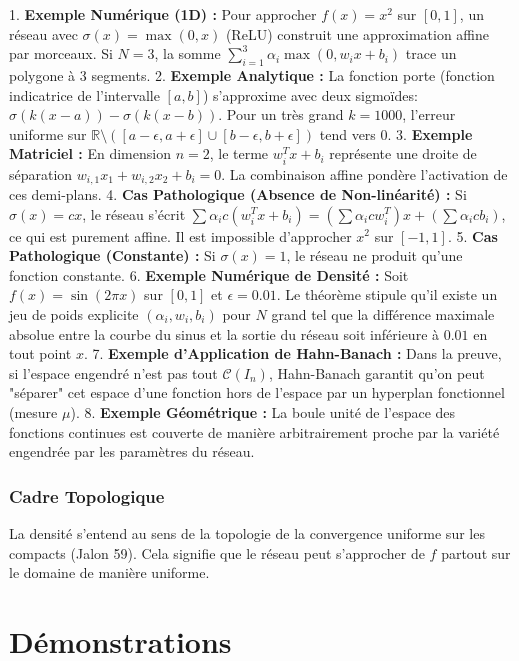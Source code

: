 \documentclass[11pt,a4paper]{article}
\begin{document}
1. \textbf{Exemple Numérique (1D) :} Pour approcher $f(x) = x^2$ sur $[0,1]$, un réseau avec $\sigma(x) = \max(0,x)$ (ReLU) construit une approximation affine par morceaux. Si $N=3$, la somme $\sum_{i=1}^3 \alpha_i \max(0, w_i x + b_i)$ trace un polygone à 3 segments.
2. \textbf{Exemple Analytique :} La fonction porte (fonction indicatrice de l'intervalle $[a,b]$) s'approxime avec deux sigmoïdes: $\sigma(k(x-a)) - \sigma(k(x-b))$. Pour un très grand $k=1000$, l'erreur uniforme sur $\mathbb{R} \setminus ([a-\epsilon, a+\epsilon] \cup [b-\epsilon, b+\epsilon])$ tend vers $0$.
3. \textbf{Exemple Matriciel :} En dimension $n=2$, le terme $w_i^T x + b_i$ représente une droite de séparation $w_{i,1} x_1 + w_{i,2} x_2 + b_i = 0$. La combinaison affine pondère l'activation de ces demi-plans.
4. \textbf{Cas Pathologique (Absence de Non-linéarité) :} Si $\sigma(x) = cx$, le réseau s'écrit $\sum \alpha_i c(w_i^T x + b_i) = (\sum \alpha_i c w_i^T) x + (\sum \alpha_i c b_i)$, ce qui est purement affine. Il est impossible d'approcher $x^2$ sur $[-1, 1]$.
5. \textbf{Cas Pathologique (Constante) :} Si $\sigma(x) = 1$, le réseau ne produit qu'une fonction constante.
6. \textbf{Exemple Numérique de Densité :} Soit $f(x) = \sin(2\pi x)$ sur $[0,1]$ et $\epsilon = 0.01$. Le théorème stipule qu'il existe un jeu de poids explicite $(\alpha_i, w_i, b_i)$ pour $N$ grand tel que la différence maximale absolue entre la courbe du sinus et la sortie du réseau soit inférieure à $0.01$ en tout point $x$.
7. \textbf{Exemple d'Application de Hahn-Banach :} Dans la preuve, si l'espace engendré n'est pas tout $\mathcal{C}(I_n)$, Hahn-Banach garantit qu'on peut "séparer" cet espace d'une fonction hors de l'espace par un hyperplan fonctionnel (mesure $\mu$).
8. \textbf{Exemple Géométrique :} La boule unité de l'espace des fonctions continues est couverte de manière arbitrairement proche par la variété engendrée par les paramètres du réseau.


\subsubsection{Cadre Topologique}

La densité s'entend au sens de la topologie de la convergence uniforme sur les compacts (Jalon 59). Cela signifie que le réseau peut s'approcher de $f$ partout sur le domaine de manière uniforme.

\section{Démonstrations}
\end{document}
